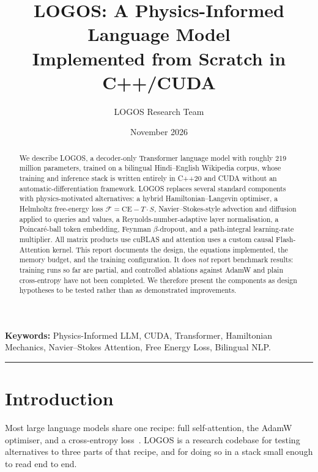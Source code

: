 \documentclass[11pt,a4paper]{article}
\title{%
  \textbf{LOGOS: A Physics-Informed Language Model\\
  Implemented from Scratch in C++/CUDA}
}
\author[1]{LOGOS Research Team}
\affil[1]{Independent Research, Open Source Project}
\date{November 2026}
\newcommand{\LOGOS}{\textsc{LOGOS}}
\newcommand{\calF}{\mathcal{F}}
\newcommand{\CE}{\mathrm{CE}}
\begin{document}
\maketitle

\begin{abstract}
We describe \LOGOS{}, a decoder-only Transformer language model with
roughly 219 million parameters, trained on a bilingual Hindi--English
Wikipedia corpus, whose training and inference stack is written entirely
in C++20 and CUDA without an automatic-differentiation framework.
\LOGOS{} replaces several standard components with physics-motivated
alternatives: a hybrid Hamiltonian--Langevin optimiser, a Helmholtz
free-energy loss $\calF = \CE - T\cdot S$, Navier--Stokes-style advection
and diffusion applied to queries and values, a Reynolds-number-adaptive
layer normalisation, a Poincar\'e-ball token embedding, Feynman
$\beta$-dropout, and a path-integral learning-rate multiplier. All
matrix products use cuBLAS and attention uses a custom causal
Flash-Attention kernel. This report documents the design, the equations
implemented, the memory budget, and the training configuration. It does
\emph{not} report benchmark results: training runs so far are partial,
and controlled ablations against AdamW and plain cross-entropy have not
been completed. We therefore present the components as design hypotheses
to be tested rather than as demonstrated improvements.
\end{abstract}

\textbf{Keywords:} Physics-Informed LLM, CUDA, Transformer, Hamiltonian
Mechanics, Navier--Stokes Attention, Free Energy Loss, Bilingual NLP.

\vspace{1em}
\hrule
\vspace{1em}

\section{Introduction}
\label{sec:intro}

Most large language models share one recipe: full self-attention, the
AdamW optimiser, and a cross-entropy loss~\citep{brown2020gpt3,chowdhery2022palm,touvron2023llama}.
\LOGOS{} is a research codebase for testing alternatives to three parts
of that recipe, and for doing so in a stack small enough to read end to
end.
\end{document}
